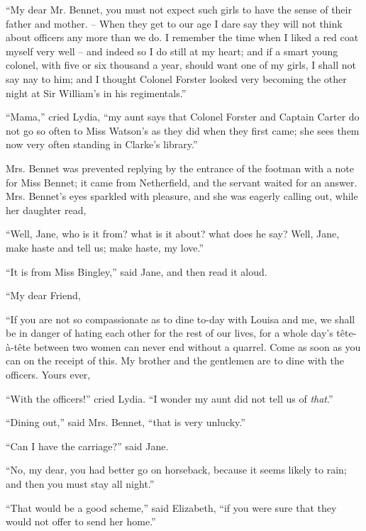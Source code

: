 “My dear Mr. Bennet, you must not expect such girls
to have the sense of their father and mother. -- When
they get to our age I dare say they will not think about
officers any more than we do. I remember the time when
I liked a red coat myself very well -- and indeed so I do
still at my heart; and if a smart young colonel, with
five or six thousand a year, should want one of my girls,
I shall not say nay to him; and I thought Colonel Forster
looked very becoming the other night at Sir William’s in
his regimentals.”

“Mama,” cried Lydia, “my aunt says that Colonel
Forster and Captain Carter do not go so often to Miss
Watson’s as they did when they first came; she sees
them now very often standing in Clarke’s library.”

Mrs. Bennet was prevented replying by the entrance of
the footman with a note for Miss Bennet; it came from
Netherfield, and the servant waited for an answer. Mrs.
Bennet’s eyes sparkled with pleasure, and she was eagerly
calling out, while her daughter read,

“Well, Jane, who is it from? what is it about? what
does he say? Well, Jane, make haste and tell us; make
haste, my love.”

“It is from Miss Bingley,” said Jane, and then read
it aloud.

\begin{letter}
“My dear Friend,

“If you are not so compassionate as to dine to-day
with Louisa and me, we shall be in danger of hating each
other for the rest of our lives, for a whole day’s tête-à-tête
between two women can never end without a quarrel.
Come as soon as you can on the receipt of this. My
brother and the gentlemen are to dine with the officers.
Yours ever,

\end{letter}

“With the officers!” cried Lydia. “I wonder my
aunt did not tell us of \textit{that}.”

“Dining out,” said Mrs. Bennet, “that is very
unlucky.”

“Can I have the carriage?” said Jane.

“No, my dear, you had better go on horseback, because
it seems likely to rain; and then you must stay all night.”

“That would be a good scheme,” said Elizabeth, “if you
were sure that they would not offer to send her home.”

